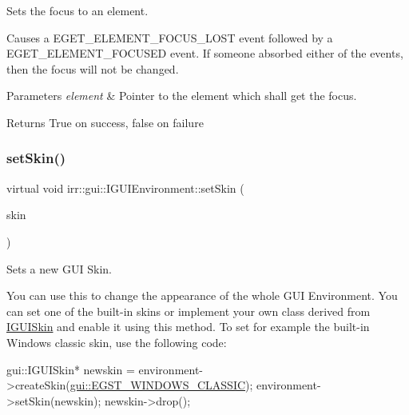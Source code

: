 Sets the focus to an element. 

Causes a E\+G\+E\+T\+\_\+\+E\+L\+E\+M\+E\+N\+T\+\_\+\+F\+O\+C\+U\+S\+\_\+\+L\+O\+ST event followed by a E\+G\+E\+T\+\_\+\+E\+L\+E\+M\+E\+N\+T\+\_\+\+F\+O\+C\+U\+S\+ED event. If someone absorbed either of the events, then the focus will not be changed. 
\begin{DoxyParams}{Parameters}
{\em element} & Pointer to the element which shall get the focus. \\
\hline
\end{DoxyParams}
\begin{DoxyReturn}{Returns}
True on success, false on failure 
\end{DoxyReturn}
\mbox{\label{classirr_1_1gui_1_1IGUIEnvironment_ae7042c520e848643e080ad4532797f23}} 
\subsubsection{\texorpdfstring{set\+Skin()}{setSkin()}\hspace{0.1cm}{\footnotesize\ttfamily [1/2]}}
{\footnotesize\ttfamily virtual void irr\+::gui\+::\+I\+G\+U\+I\+Environment\+::set\+Skin (\begin{DoxyParamCaption}\item[{\hyperlink{classirr_1_1gui_1_1IGUISkin}{I\+G\+U\+I\+Skin} $\ast$}]{skin }\end{DoxyParamCaption})\hspace{0.3cm}{\ttfamily [pure virtual]}}



Sets a new G\+UI Skin. 

You can use this to change the appearance of the whole G\+UI Environment. You can set one of the built-\/in skins or implement your own class derived from \hyperlink{classirr_1_1gui_1_1IGUISkin}{I\+G\+U\+I\+Skin} and enable it using this method. To set for example the built-\/in Windows classic skin, use the following code\+: 
\begin{DoxyCode}
gui::IGUISkin* newskin = environment->createSkin(\hyperlink{namespaceirr_1_1gui_a7b4619db540cbdf96e81023893b4eca5a19cf56de39bd4775be379ac8198cb280}{gui::EGST\_WINDOWS\_CLASSIC});
environment->setSkin(newskin);
newskin->drop();
\end{DoxyCode}
 
